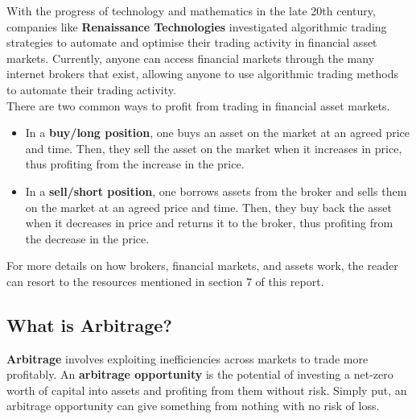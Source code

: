 \documentclass[11pt]{article}
\begin{document}
With the progress of technology and mathematics in the late 20th century, companies like \textbf{Renaissance Technologies} investigated algorithmic trading strategies to automate and optimise their trading activity in financial asset markets.
Currently, anyone can access financial markets through the many internet brokers that exist, allowing anyone to use algorithmic trading methods to automate their trading activity.\\

There are two common ways to profit from trading in financial asset markets.

\begin{itemize}

    \item In a \textbf{buy/long position}, one buys an asset on the market at an agreed price and time. Then, they sell the asset on the market when it increases in price, thus profiting from the increase in the price.
    
    \item In a \textbf{sell/short position}, one borrows assets from the broker and sells them on the market at an agreed price and time. Then, they buy back the asset when it decreases in price and returns it to the broker, thus profiting from the decrease in the price.
    
\end{itemize}

For more details on how brokers, financial markets, and assets work, the reader can resort to the resources mentioned in section 7 of this report.

\newpage

\subsection{What is Arbitrage?}

\textbf{Arbitrage} involves exploiting inefficiencies across markets to trade more profitably.
An \textbf{arbitrage opportunity} is the potential of investing a net-zero worth of capital into assets and profiting from them without risk.
Simply put, an arbitrage opportunity can give something from nothing with no risk of loss.\\
\end{document}
